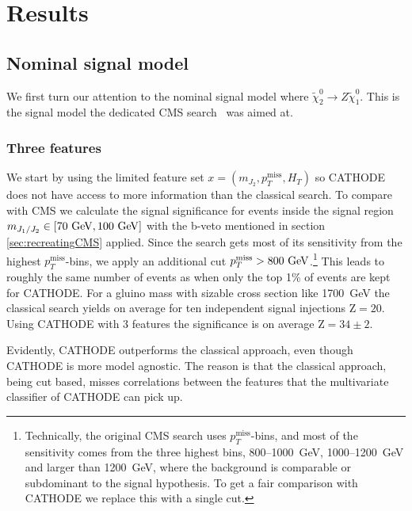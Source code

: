 \documentclass[prd, twocolumn, superscriptaddress,floatfix, nofootinbib, preprintnumbers]{revtex4-2}
\begin{document}
\section{Results}
\label{sec:results}

\subsection{Nominal signal model}

We first turn our attention to the nominal signal model where $\widetilde{\chi}_2^0 \rightarrow Z \widetilde{\chi}_1^0$. This is the signal model the dedicated CMS search~\cite{CMS:2020fia} was aimed at.

\subsubsection{Three features}

We start by using the limited feature set $x=\left(m_{J_2}, p_T^\text{miss},H_T\right)$ so CATHODE does not have access to more information than the classical search.
To compare with CMS we calculate the signal significance for events inside the signal region $m_{J_1 / J_2} \in [70~{\rm GeV},100~{\rm GeV}]$ with the b-veto mentioned in section \ref{sec:recreatingCMS} applied. Since the search gets most of its sensitivity from the highest $p_T^\text{miss}$-bins, we apply an additional cut $p_T^\text{miss}> 800~{\rm GeV}$.\footnote{Technically, the original CMS search uses $p^\text{miss}_T$-bins, and most of the sensitivity comes from the three highest bins, 800--1000~GeV, 1000--1200~GeV and larger than 1200~GeV, where the background is comparable or subdominant to the signal hypothesis. 
To get a fair comparison with CATHODE we replace this with a single cut.} This leads to roughly the same number of events as when only the top 1\% of events are kept for CATHODE.
For a gluino mass with sizable cross section like 1700~GeV the classical search yields on average for ten independent signal injections $\text{Z}=20$. Using CATHODE with 3 features the significance is on average $\text{Z}=34\pm 2$. 

Evidently, CATHODE outperforms the classical approach, even though CATHODE is more model agnostic. The reason is that the classical approach, being cut based,  misses correlations between the features that the multivariate classifier of CATHODE can pick up.
\end{document}
